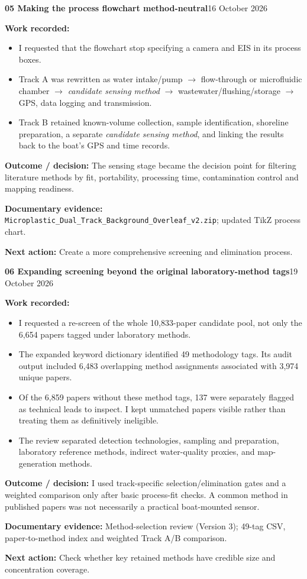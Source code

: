 \documentclass[11pt,a4paper]{article}
\newcommand{\logentry}[3]{%
  \Needspace{13\baselineskip}%
  \vspace{8pt}%
  {\large\bfseries\color{ink}#1 \quad #2}\hfill{\small\color{ink}#3}\par
  \vspace{-3pt}{\color{linecolor}\rule{\linewidth}{.6pt}}\par\vspace{1pt}%
}
\newcommand{\result}[1]{\textbf{Outcome / decision:} #1\par}
\newcommand{\evidence}[1]{\textbf{Documentary evidence:} {\small #1}\par}
\newcommand{\nextstep}[1]{\textbf{Next action:} #1\par}
\begin{document}
\logentry{05}{Making the process flowchart method-neutral}{16 October 2026}
\textbf{Work recorded:}
\begin{itemize}
\item I requested that the flowchart stop specifying a camera and EIS in its process boxes.
\item Track A was rewritten as water intake/pump $\rightarrow$ flow-through or microfluidic chamber $\rightarrow$ \emph{candidate sensing method} $\rightarrow$ wastewater/flushing/storage $\rightarrow$ GPS, data logging and transmission.
\item Track B retained known-volume collection, sample identification, shoreline preparation, a separate \emph{candidate sensing method}, and linking the results back to the boat's GPS and time records.
\end{itemize}
\result{The sensing stage became the decision point for filtering literature methods by fit, portability, processing time, contamination control and mapping readiness.}
\evidence{\texttt{Microplastic\_Dual\_Track\_Background\_Overleaf\_v2.zip}; updated TikZ process chart.}
\nextstep{Create a more comprehensive screening and elimination process.}

\logentry{06}{Expanding screening beyond the original laboratory-method tags}{19 October 2026}
\textbf{Work recorded:}
\begin{itemize}
\item I requested a re-screen of the whole 10,833-paper candidate pool, not only the 6,654 papers tagged under laboratory methods.
\item The expanded keyword dictionary identified 49 methodology tags. Its audit output included 6,483 overlapping method assignments associated with 3,974 unique papers.
\item Of the 6,859 papers without these method tags, 137 were separately flagged as technical leads to inspect. I kept unmatched papers visible rather than treating them as definitively ineligible.
\item The review separated detection technologies, sampling and preparation, laboratory reference methods, indirect water-quality proxies, and map-generation methods.
\end{itemize}
\result{I used track-specific selection/elimination gates and a weighted comparison only after basic process-fit checks. A common method in published papers was not necessarily a practical boat-mounted sensor.}
\evidence{Method-selection review (Version 3); 49-tag CSV, paper-to-method index and weighted Track A/B comparison.}
\nextstep{Check whether key retained methods have credible size and concentration coverage.}
\end{document}
